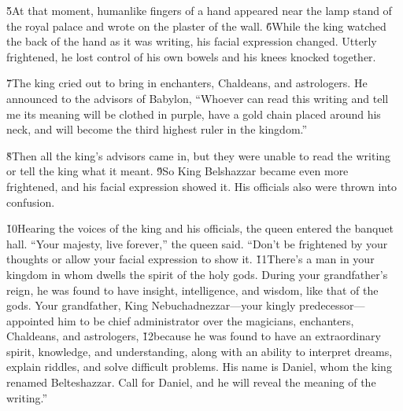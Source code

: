 \v{5}At that moment, humanlike fingers of a hand appeared near the lamp stand of the royal palace and wrote on the plaster of the wall. \v{6}While the king watched the back of the hand as it was writing, his facial expression changed. Utterly frightened, he lost control of his own bowels and his knees knocked together.

\v{7}The king cried out to bring in enchanters, Chaldeans, and astrologers. He announced to the advisors of Babylon, ``Whoever can read this writing and tell me its meaning will be clothed in purple, have a gold chain placed around his neck, and will become the third highest ruler in the kingdom.''

\v{8}Then all the king's advisors came in, but they were unable to read the writing or tell the king what it meant. \v{9}So King Belshazzar became even more frightened, and his facial expression showed it. His officials also were thrown into confusion.

\v{10}Hearing the voices of the king and his officials, the queen entered the banquet hall. ``Your majesty, live forever,'' the queen said. ``Don't be frightened by your thoughts or allow your facial expression to show it. \v{11}There's a man in your kingdom in whom dwells the spirit of the holy gods. During your grandfather's reign, he was found to have insight, intelligence, and wisdom, like that of the gods. Your grandfather, King Nebuchadnezzar---your kingly predecessor---appointed him to be chief administrator over the magicians, enchanters, Chaldeans, and astrologers, \v{12}because he was found to have an extraordinary spirit, knowledge, and understanding, along with an ability to interpret dreams, explain riddles, and solve difficult problems. His name is Daniel, whom the king renamed Belteshazzar. Call for Daniel, and he will reveal the meaning of the writing.''

